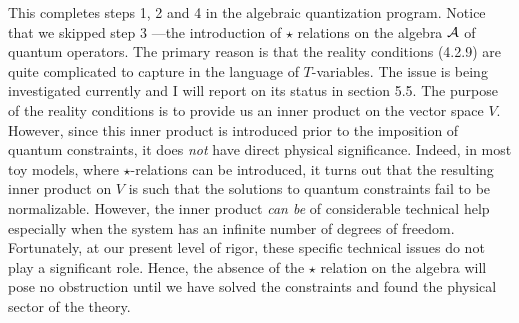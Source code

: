 This completes steps 1, 2 and 4 in the algebraic quantization program. Notice
that we skipped step 3 ---the introduction of $\star$ relations on the algebra
${\cal A}$ of quantum operators. The primary reason is that the reality
conditions (4.2.9) are quite complicated to capture in the language of
$T$-variables. The issue is being investigated currently and I will report
on its status in section 5.5. The purpose of the reality conditions is to
provide us an inner product on the vector space $V$. However, since this inner
product is introduced prior to the imposition of quantum constraints, it
does {\it not} have direct physical significance. Indeed, in most toy
models, where $\star$-relations can be introduced, it turns out that the
resulting inner product on $V$ is such that the solutions to quantum
constraints fail to be normalizable. However, the inner product {\it can be}
of considerable technical help especially when the system has an infinite
number of degrees of freedom. Fortunately, at our present level of rigor,
these specific technical issues do not play a significant role. Hence, the
absence of the $\star$ relation on the algebra will pose no obstruction until
we have solved the constraints and found the physical sector of the theory.

